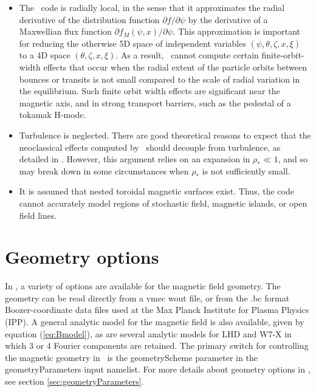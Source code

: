 \begin{itemize}

\item
The \sfincs~code is radially local, in the sense that it approximates 
the radial derivative of the distribution function $\partial f/\partial \psi$ by
the derivative of a Maxwellian flux function $\partial f_M(\psi,x)/\partial \psi$.
This approximation is important for reducing the otherwise 5D space of independent variables $(\psi,\theta,\zeta,x,\xi)$
to a 4D space $(\theta,\zeta,x,\xi)$.
As a result, \sfincs~cannot compute certain finite-orbit-width effects that occur when the radial extent of the particle orbits
between bounces or transits is not small compared to the scale of radial variation in the equilibrium.
Such finite orbit width effects are significant near the magnetic axis, and in strong transport barriers, such as the pedestal of a tokamak H-mode.

\item
Turbulence is neglected.  There are good theoretical reasons to expect that the neoclassical effects computed by \sfincs~should
decouple from turbulence, as detailed in \cite{AbelReview}.  However, this argument relies on an expansion in $\rho_* \ll 1$, and so may break down
in some circumstances when $\rho_*$ is not sufficiently small.

\item
It is assumed that nested toroidal magnetic surfaces exist. Thus, the code cannot accurately model regions of stochastic field,
magnetic islands, or open field lines.

\end{itemize}

\section{Geometry options}
In \sfincs, a variety of options are available for the magnetic field geometry.  The geometry can be read directly
from a {\ttfamily vmec wout}
file, or from the {\ttfamily .bc} format Boozer-coordinate data files used at the Max Planck Institute for Plasma Physics (IPP).
A general analytic model for the magnetic field is also available, given by equation (\ref{eq:Bmodel}),
as are several analytic models for LHD and W7-X in which 3 or 4 Fourier components are retained.
The primary switch for controlling the magnetic geometry in \sfincs~is the {\ttfamily geometryScheme} parameter
in the {\ttfamily geometryParameters} input namelist.
For more details about geometry options in \sfincs, see section \ref{sec:geometryParameters}.

